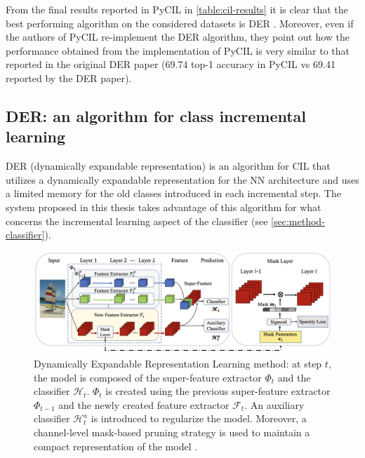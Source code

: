 From the final results reported in PyCIL in \autoref{table:cil-results} it is clear that the best performing algorithm on the considered datasets is DER \cite{yan2021dynamically}. Moreover, even if the authors of PyCIL re-implement the DER algorithm, they point out how the performance obtained from the implementation of PyCIL is very similar to that reported in the original DER paper (69.74 top-1 accuracy in PyCIL vs 69.41 reported by the DER paper).


\subsection{DER: an algorithm for class incremental learning}
\label{sec:der-algorithm}
DER (dynamically expandable representation) is an algorithm for CIL that utilizes a dynamically expandable representation for the NN architecture and uses a limited memory for the old classes introduced in each incremental step. The system proposed in this thesis takes advantage of this algorithm for what concerns the incremental learning aspect of the classifier (see \autoref{sec:method-classifier}).


\begin{figure}%
	\centering

    \begin{center}
        \includegraphics[width=\columnwidth]{images/der-pipeline.png}
    \end{center}

	\caption{Dynamically Expandable Representation Learning method: at step $t$, the model is composed of the super-feature extractor $\Phi_t$ and the classifier $\mathcal{H}_t$. $\Phi_t$ is created using the previous super-feature extractor $\Phi_{t-1}$ and the newly created feature extractor $\mathcal{F}_t$. An auxiliary classifier $\mathcal{H}_t^a$ is introduced to regularize the model. Moreover, a channel-level
    mask-based pruning strategy is used to maintain a compact representation of the model \cite{yan2021dynamically}.}%
	\label{fig:der-pipeline}%
\end{figure}


